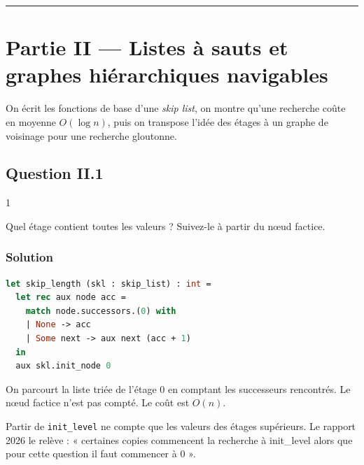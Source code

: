 \documentclass[11pt,a4paper]{article}
\begin{document}
\begin{center}\rule{0.5\linewidth}{0.5pt}\end{center}

\hypertarget{partie-ii-listes-uxe0-sauts-et-graphes-hiuxe9rarchiques-navigables}{%
\section{Partie II --- Listes à sauts et graphes hiérarchiques navigables}\label{partie-ii-listes-uxe0-sauts-et-graphes-hiuxe9rarchiques-navigables}}

On écrit les fonctions de base d'une \emph{skip list}, on montre qu'une recherche coûte en moyenne \(O(\log n)\), puis on transpose l'idée des étages à un graphe de voisinage pour une recherche gloutonne.

\hypertarget{question-ii.1}{%
\subsection{Question II.1}\label{question-ii.1}}

\begin{indication}{1}

Quel étage contient toutes les valeurs ? Suivez-le à partir du nœud factice.

\end{indication}

\hypertarget{solution-10}{%
\subsubsection{Solution}\label{solution-10}}

\begin{lstlisting}[language=Caml]
let skip_length (skl : skip_list) : int =
  let rec aux node acc =
    match node.successors.(0) with
    | None -> acc
    | Some next -> aux next (acc + 1)
  in
  aux skl.init_node 0
\end{lstlisting}

On parcourt la liste triée de l'étage 0 en comptant les successeurs rencontrés. Le nœud factice n'est pas compté. Le coût est \(O(n)\).

\begin{piege}

Partir de \texttt{init\_level} ne compte que les valeurs des étages supérieurs. Le rapport 2026 le relève : « certaines copies commencent la recherche à init\_level alors que pour cette question il faut commencer à 0 ».

\end{piege}
\end{document}

